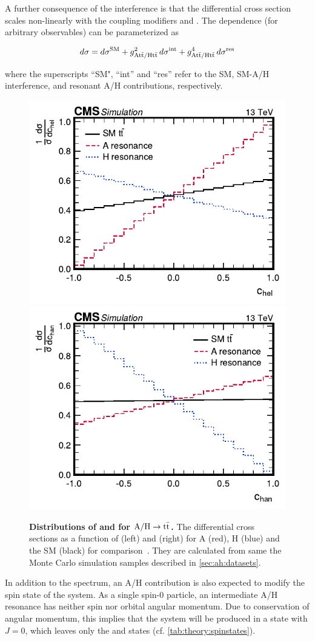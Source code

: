 A further consequence of the interference is that the differential cross section scales non-linearly with the coupling modifiers \gAtt and \gHtt. The dependence (for arbitrary observables) can be parameterized as 

\begin{equation}
\label{eq:theory:ahxs}
    d \sigma = d \sigma^{\mathrm{SM}} + g_{\mathrm{A t \bar{t} / H t \bar{t}}}^2 \, d \sigma^{\mathrm{int}} + g_{\mathrm{A t \bar{t} / H t \bar{t}}}^4 \, d \sigma^{\mathrm{res}}
\end{equation}

\noindent where the superscripts ``SM", ``int'' and ``res'' refer to the SM, SM-A/H interference, and resonant A/H contributions, respectively.

\begin{figure}[ht!]
    \centering
    \includegraphics[width=0.49\linewidth]{figures/ah/chel_lhe_paper.pdf}
    \hfill
    \includegraphics[width=0.49\linewidth]{figures/ah/chan_lhe_paper.pdf}
    \caption{\textbf{Distributions of \chel and \chan for $\mathrm{A/H} \rightarrow \mathrm{t \bar{t}}$.} The differential cross sections as a function of \chel (left) and \chan (right) for A (red), H (blue) and the SM (black) for comparison~\cite{CMS:HIG-22-013}. They are calculated from same the Monte Carlo simulation samples described in \cref{sec:ah:datasets}.}
    \label{fig:theory:ah_chelchan}
\end{figure}

In addition to the \mtt spectrum, an A/H contribution is also expected to modify the spin state of the \ttbar system. As a single spin-0 particle, an intermediate A/H resonance has neither spin nor orbital angular momentum. Due to conservation of angular momentum, this implies that the \ttbar system will be produced in a state with $J = 0$, which leaves only the  and  states (cf. \cref{tab:theory:spinstates}).

